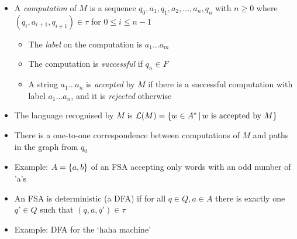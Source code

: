 \begin{itemize}
\begin{itemize}
	\end{itemize}

	\item A \textit{computation} of $ M $ is a sequence $ q_0, a_1, q_1, a_2, \dots, a_n, q_n $ with $ n \ge 0 $ where $ (q_i, a_{i+1}, q_{i+1}) \in \tau $ for $ 0 \le i \le n - 1 $
	
	\begin{itemize}
		
		\item The \textit{label} on the computation is $ a_1 \dots a_m $
		
		\item The computation is \textit{successful} if $ q_n \in F $
		
		\item A string $ a_1 \dots a_n $ is \textit{accepted} by $ M $ if there is a successful computation with label $ a_1 \dots a_n $, and it is \textit{rejected} otherwise
		
	\end{itemize}

	\item The language recognised by $ M $ is $ \mathcal{L}(M) = \left\lbrace w \in A^* \, | \, w \text{ is accepted by } M \right\rbrace $
	
	\item There is a one-to-one correspondence between computations of $ M $ and paths in the graph from $ q_0 $	
	
	\item Example: $ A = \left\lbrace a, b \right\rbrace $ of an FSA accepting only words with an odd number of 'a's
	
	
	\item An FSA is deterministic (a DFA) if for all $ q \in Q, a \in A $ there is exactly one $ q' \in Q $ such that $ (q, a, q') \in \tau $
	
	\item Example: DFA for the `haha machine'
	
\end{itemize}
